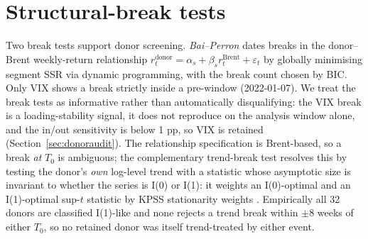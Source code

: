 \section{Structural-break tests}\label{app:breaks}
Two break tests support donor screening. \emph{Bai--Perron}
\citep{baiperron1998,baiperron2003} dates breaks in the donor--Brent weekly-return
relationship $r^{\text{donor}}_t=\alpha_s+\beta_s r^{\text{Brent}}_t+\varepsilon_t$ by
globally minimising segment SSR via dynamic programming, with the break count chosen by BIC.
Only VIX shows a break strictly inside a pre-window (2022-01-07). We treat the break tests as
informative rather than automatically disqualifying: the VIX break is a loading-stability
signal, it does not reproduce on the analysis window alone, and the in/out sensitivity is
below 1 pp, so VIX is retained (Section~\ref{sec:donoraudit}). The relationship specification is
Brent-based, so a break \emph{at} $T_0$ is ambiguous; the
complementary \citet{harvey2009} trend-break test resolves this by testing the donor's
\emph{own} log-level trend with a statistic whose asymptotic size is invariant to whether the
series is I(0) or I(1): it weights an I(0)-optimal and an I(1)-optimal sup-$t$ statistic by
KPSS stationarity weights \citep{kpss1992}. Empirically all 32 donors are classified I(1)-like
and none rejects a trend break within $\pm$8 weeks of either $T_0$, so no retained donor was
itself trend-treated by either event.

